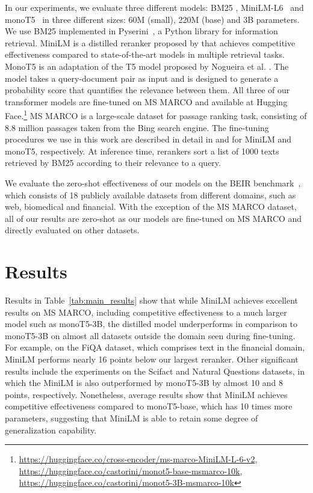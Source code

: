 \documentclass[sigconf,nonacm]{acmart}
\begin{document}
In our experiments, we evaluate three different models: BM25 \cite{lin2021pyserini}, MiniLM-L6~\cite{minilm} and monoT5~\cite{nogueira2020document} in three different sizes: 60M (small), 220M (base) and 3B parameters.
We use BM25 implemented in Pyserini~\cite{lin2021pyserini}, a Python library for information retrieval. MiniLM is a distilled reranker proposed by \citet{minilm} that achieves competitive effectiveness compared to state-of-the-art models in multiple retrieval tasks.
MonoT5 is an adaptation of the T5 model \cite{raffel2020t5} proposed by Nogueira et al. \cite{nogueira2020document}. The model takes a query-document pair as input and is designed to generate a probability score that quantifies the relevance between them. All three of our transformer models are fine-tuned on MS MARCO \cite{marco} and available at Hugging Face.\footnote{\url{https://huggingface.co/cross-encoder/ms-marco-MiniLM-L-6-v2},\\\url{https://huggingface.co/castorini/monot5-base-msmarco-10k},\\ \url{https://huggingface.co/castorini/monot5-3B-msmarco-10k}} MS MARCO is a large-scale dataset for passage ranking task, consisting of 8.8 million passages taken from the Bing search engine. The fine-tuning procedures we use in this work are described in detail in \citet{reimers-2019-sentence-bert} and \citet{nogueira2020document} for MiniLM and monoT5, respectively. At inference time, rerankers sort a list of 1000 texts retrieved by BM25 according to their relevance to a query.

We evaluate the zero-shot effectiveness of our models on the BEIR benchmark~\citet{beir}, which consists of 18 publicly available datasets from different domains, such as web, biomedical and financial. With the exception of the MS MARCO dataset, all of our results are zero-shot as our models are fine-tuned on MS MARCO and directly evaluated on other datasets.



\section{Results}


Results in Table~\ref{tab:main_results} show that while MiniLM achieves excellent results on MS MARCO, including competitive effectiveness to a much larger model such as monoT5-3B, the distilled model underperforms in comparison to monoT5-3B on almost all datasets outside the domain seen during fine-tuning. For example, on the FiQA dataset, which comprises text in the financial domain, MiniLM performs nearly 16 points below our largest reranker. Other significant results include the experiments on the Scifact and Natural Questions datasets, in which the MiniLM is also outperformed by monoT5-3B by almost 10 and 8 points, respectively. Nonetheless, average results show that MiniLM achieves competitive effectiveness compared to monoT5-base, which has 10 times more parameters, suggesting that MiniLM is able to retain some degree of generalization capability.
\end{document}
